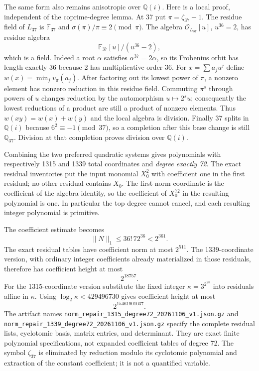 \documentclass[11pt]{article}
\theoremstyle{definition}
\begin{document}
The same form also remains anisotropic over $\mathbb Q(i)$.
Here is a local proof, independent of the coprime-degree lemma.
At 37 put $\pi=\zeta_{37}-1$.  The residue field of
$L_{37}$ is $\mathbb F_{37}$ and
$\sigma(\pi)/\pi\equiv2\pmod\pi$.
The algebra $\mathcal O_{L_{37}}[u]$, $u^{36}=2$, has residue
algebra
\[
                    \mathbb F_{37}[u]/(u^{36}-2),
\]
which is a field.  Indeed a root $\alpha$ satisfies
$\alpha^{37}=2\alpha$, so its Frobenius orbit has length
exactly 36 because 2 has multiplicative order 36.
For $x=\sum a_j u^j$ define $w(x)=\min_j v_\pi(a_j)$.
After factoring out its lowest power of $\pi$, a nonzero
element has nonzero reduction in this residue field.
Commuting $\pi^s$ through powers of $u$ changes reduction
by the automorphism $u\mapsto2^su$; consequently the lowest
reductions of a product are still a product of nonzero
elements.  Thus $w(xy)=w(x)+w(y)$ and the local algebra
is division.  Finally 37 splits in $\mathbb Q(i)$ because
$6^2\equiv-1\pmod{37}$, so a completion after this base
change is still $\mathbb Q_{37}$.  Division at that completion
proves division over $\mathbb Q(i)$.

Combining the two preferred quadratic systems gives polynomials
with respectively 1315 and 1339 total coordinates and
\emph{degree exactly 72}.  The exact residual inventories put
the input monomial $X_0^2$ with coefficient one in the first
residual; no other residual contains $X_0$.  The first norm
coordinate is the coefficient of the algebra identity, so the
coefficient of $X_0^{72}$ in the resulting polynomial is one.
In particular the top degree cannot cancel, and each resulting
integer polynomial is primitive.

The coefficient estimate becomes
\[
                      \|N\|_1\le36!\,72^{36}<2^{361}.
\]
The exact residual tables have coefficient norm at most
$2^{511}$.  The 1339-coordinate version, with ordinary
integer coefficients already materialized in those residuals,
therefore has coefficient height at most
\[
                              2^{18757}.
\]
For the 1315-coordinate version substitute the fixed integer
$\kappa=3^{2^{28}}$ into residuals affine in $\kappa$.
Using $\log_2\kappa<429496730$ gives coefficient height at
most
\[
                              2^{15461901037}.
\]
The artifact names
\nolinkurl{norm_repair_1315_degree72_20261106_v1.json.gz}
and
\nolinkurl{norm_repair_1339_degree72_20261106_v1.json.gz}
specify the complete residual lists, cyclotomic basis,
matrix entries, and determinant.  They are exact finite
polynomial specifications, not expanded coefficient tables
of degree 72.  The symbol $\zeta_{37}$ is eliminated by
reduction modulo its cyclotomic polynomial and extraction
of the constant coefficient; it is not a quantified variable.
\end{document}
